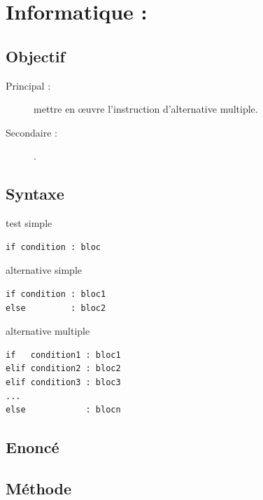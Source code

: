 \section{Informatique : }

\subsection{Objectif}\label{tests:informatique:objectif}
\begin{description}
\item[Principal : ] mettre en \oe uvre l'instruction d'alternative multiple.
\item[Secondaire :] .
\end{description}

\subsection{Syntaxe \python}\label{tests:informatique:python}
\noindent\begin{minipage}[t]{0.3\textwidth}
test simple\footnotesize
\begin{Verbatim}
if condition : bloc
\end{Verbatim}
\end{minipage}
\hfill
\begin{minipage}[t]{0.3\textwidth}
alternative simple\footnotesize
\begin{Verbatim}
if condition : bloc1
else         : bloc2
\end{Verbatim}
\end{minipage}
\hfill
\begin{minipage}[t]{0.3\textwidth}
alternative multiple\footnotesize
\begin{Verbatim}
if   condition1 : bloc1
elif condition2 : bloc2
elif condition3 : bloc3
...
else            : blocn
\end{Verbatim}
\end{minipage}

\subsection{Enoncé}\label{tests:informatique:enonce}

\subsection{Méthode}\label{tests:informatique:methode}

